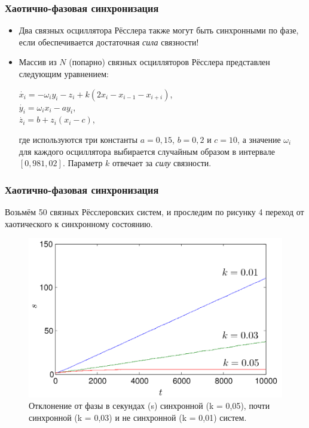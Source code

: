 \documentclass{beamer}
\begin{document}

\begin{frame}
\frametitle{Хаотично-фазовая синхронизация}

\begin{itemize}
\item[]Два связных осциллятора Рёсслера также могут быть синхронными по фазе, если обеспечивается достаточная \textit{сила} связности!
\bigskip
\item[] Массив из $N$ (попарно) связных осцилляторов Рёсслера представлен следующим уравнением:
\begin{center}
$\dot{x_i} = -\omega_iy_i - z_i +k(2x_i - x_{i-1} - x_{i+i})$,\\
$\dot{y_i} = \omega_ix_i - ay_i$,\\
$\dot{z_i} = b + z_i(x_i - c)$,
\end{center}
где используются три константы $a=0,15$, $b=0,2$ и $c=10$, а значение $\omega_i$ для каждого осциллятора выбирается случайным образом в интервале $[0,98 1,02]$. Параметр $k$ отвечает за \textit{силу} связности.
\end{itemize}

\end{frame}


\begin{frame}
\frametitle{Хаотично-фазовая синхронизация}

Возьмём 50 связных Рёсслеровских систем, и проследим по рисунку 4 переход от хаотического к синхронному состоянию. 

\begin{figure}
\includegraphics[scale=0.25]{img/phase_standard_deviation}
\caption{Отклонение от фазы в секундах (s) синхронной (k = 0,05), почти синхронной (k = 0,03) и не синхронной (k = 0,01) систем.}
\end{figure}

\end{frame}
\end{document}
